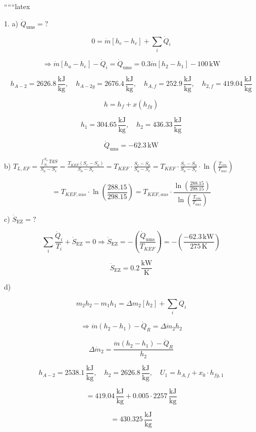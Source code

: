 
``````latex


1. a) $\dot{Q}_{\text{ums}} = ?$

\[
0 = \dot{m} [h_e - h_c] + \sum_i \dot{Q}_i
\]

\[
\Rightarrow \dot{m} [h_a - h_e] - \dot{Q}_i = \dot{Q}_{\text{ums}} = 0.3 \dot{m} [h_2 - h_1] - 100 \, \text{kW}
\]

\[
h_{A-2} = 2626.8 \, \frac{\text{kJ}}{\text{kg}}, \quad h_{A-2g} = 2676.4 \, \frac{\text{kJ}}{\text{kg}}, \quad h_{A,f} = 252.9 \, \frac{\text{kJ}}{\text{kg}}, \quad h_{2,f} = 419.04 \, \frac{\text{kJ}}{\text{kg}}
\]

\[
h = h_f + x (h_{fg})
\]

\[
h_1 = 304.65 \, \frac{\text{kJ}}{\text{kg}}, \quad h_2 = 436.33 \, \frac{\text{kJ}}{\text{kg}}
\]

\[
\dot{Q}_{\text{ums}} = -62.3 \, \text{kW}
\]

b) $T_{L,EF} = \frac{\int_{S_e}^{S_a} T dS}{S_a - S_e} = \frac{T_{KEF} (S_e - S_a)}{S_a - S_e} = T_{KEF} \cdot \frac{S_e - S_a}{S_a - S_e} = T_{KEF} \cdot \frac{S_e - S_a}{S_a - S_e} \cdot \ln \left( \frac{T_{ein}}{T_{aus}} \right)$

\[
= T_{KEF,aus} \cdot \ln \left( \frac{288.15}{298.15} \right) = T_{KEF,aus} \cdot \frac{\ln \left( \frac{288.15}{298.15} \right)}{\ln \left( \frac{T_{ein}}{T_{aus}} \right)}
\]

c) $\dot{S}_{\text{EZ}} = ?$

\[
\sum_i \frac{\dot{Q}_i}{T_i} + \dot{S}_{\text{EZ}} = 0 \Rightarrow \dot{S}_{\text{EZ}} = - \left( \frac{\dot{Q}_{\text{ums}}}{T_{KEF}} \right) = - \left( \frac{-62.3 \, \text{kW}}{275 \, \text{K}} \right)
\]

\[
\dot{S}_{\text{EZ}} = 0.2 \, \frac{\text{kW}}{\text{K}}
\]

d)

\[
m_2 h_2 - m_1 h_1 = \Delta m_2 [h_2] + \sum_i Q_i
\]

\[
\Rightarrow \dot{m} (h_2 - h_1) - \dot{Q}_R = \Delta \dot{m}_2 h_2
\]

\[
\Delta \dot{m}_2 = \frac{\dot{m} (h_2 - h_1) - \dot{Q}_R}{h_2}
\]

\[
h_{A-2} = 2538.1 \, \frac{\text{kJ}}{\text{kg}}, \quad h_2 = 2626.8 \, \frac{\text{kJ}}{\text{kg}}, \quad U_1 = h_{A,f} + x_0 \cdot h_{fg,1}
\]

\[
= 419.04 \, \frac{\text{kJ}}{\text{kg}} + 0.005 \cdot 2257 \, \frac{\text{kJ}}{\text{kg}}
\]

\[
= 430.325 \, \frac{\text{kJ}}{\text{kg}}
\]

